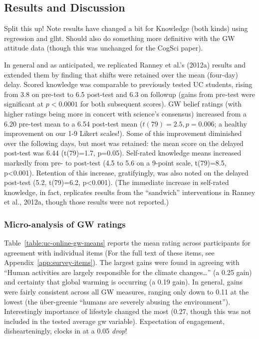 \subsection{Results and Discussion} 

Split this up! Note results have changed a bit for Knowledge (both kinds) using
regression and glht. Should also do something more definitive with the GW
attitude data (though this was unchanged for the CogSci paper).

In general and as anticipated, we replicated Ranney et
al.’s (2012a) results and extended them by finding that shifts were retained
over the mean (four-day) delay. 
Scored knowledge was comparable to previously
tested UC students, rising from 3.8 on pre-test to 6.5 post-test and 6.3 on
followup (gains from pre-test were significant at $p<0.0001$ for both subsequent
scores). GW belief ratings (with higher ratings being
more in concert with science’s consensus) increased from a 6.20 pre-test mean to
a 6.54 post-test mean ($t(79)=2.5, p=0.006$; a healthy improvement on our 1-9
Likert scales!). Some of this improvement
diminished over the following days, but most was retained: the mean score on the
delayed post-test was 6.44 (t(79)=1.7, p=0.05). Self-rated knowledge means
increased markedly from pre- to post-test (4.5 to 5.6 on a 9-point scale,
t(79)=8.5, p<0.001). Retention of this increase, gratifyingly, was also noted on
the delayed post-test (5.2, t(79)=6.2, p<0.001). (The immediate increase in
self-rated knowledge, in fact, replicates results from the ``sandwich''
interventions in Ranney et al., 2012a, though those results were not reported.)

\subsubsection{Micro-analysis of GW ratings}

Table~\ref{table:uc-online-gw-means} reports the mean rating across participants
for agreement with individual items (For the full text of these items, see
Appendix~\ref{app:survey-items}). The largest gains were found in agreeing with
``Human activities are largely responsible for the climate changes\ldots'' (a
0.25 gain) and certainty that global warming is occurring (a 0.19 gain).  In
general, gains were fairly consistent across all GW measures, ranging only
down to 0.11 at the lowest (the über-greenie “humans are severely abusing the
environment”). Interestingly importance of lifestyle changed the most
(0.27, though this was not included in the tested average gw variable).
Expectation of engagement, dishearteningly, clocks in at a 0.05 \emph{drop}! 

